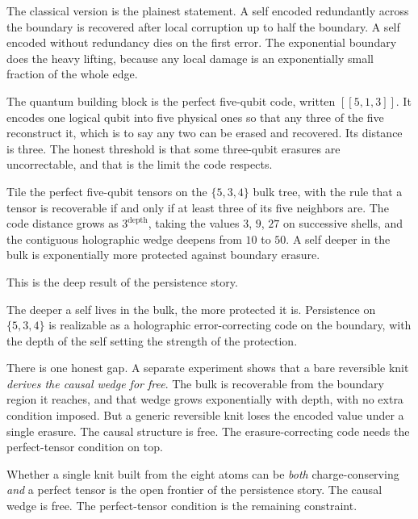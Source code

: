 The classical version is the plainest statement. A self encoded redundantly across the boundary is recovered after local corruption up to half the boundary. A self encoded without redundancy dies on the first error. The exponential boundary does the heavy lifting, because any local damage is an exponentially small fraction of the whole edge.

The quantum building block is the perfect five-qubit code, written $[[5,1,3]]$. It encodes one logical qubit into five physical ones so that any three of the five reconstruct it, which is to say any two can be erased and recovered. Its distance is three. The honest threshold is that some three-qubit erasures are uncorrectable, and that is the limit the code respects.

\begin{proposition}
Tile the perfect five-qubit tensors on the $\{5,3,4\}$ bulk tree, with the rule that a tensor is recoverable if and only if at least three of its five neighbors are. The code distance grows as $3^{\text{depth}}$, taking the values $3$, $9$, $27$ on successive shells, and the contiguous holographic wedge deepens from $10$ to $50$. A self deeper in the bulk is exponentially more protected against boundary erasure.
\end{proposition}

This is the deep result of the persistence story.

\begin{result}
The deeper a self lives in the bulk, the more protected it is. Persistence on $\{5,3,4\}$ is realizable as a holographic error-correcting code on the boundary, with the depth of the self setting the strength of the protection.
\end{result}

There is one honest gap. A separate experiment shows that a bare reversible knit \emph{derives the causal wedge for free}. The bulk is recoverable from the boundary region it reaches, and that wedge grows exponentially with depth, with no extra condition imposed. But a generic reversible knit loses the encoded value under a single erasure. The causal structure is free. The erasure-correcting code needs the perfect-tensor condition on top.

\begin{principle}
Whether a single knit built from the eight atoms can be \emph{both} charge-conserving \emph{and} a perfect tensor is the open frontier of the persistence story. The causal wedge is free. The perfect-tensor condition is the remaining constraint.
\end{principle}

